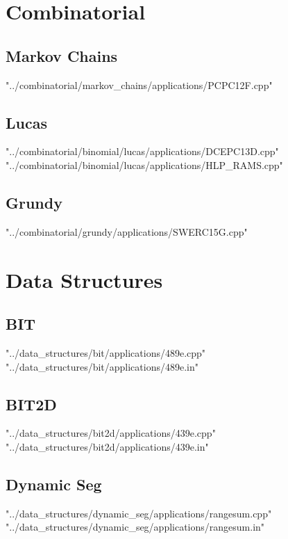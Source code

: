 \documentclass [12pt,onecolumn,oneside]{article}
\begin{document}
\pagestyle{fancy}
\fancyfoot{}
\fancyhead[R]{\thepage}
\renewcommand{\headrulewidth}{0.4pt}
\tableofcontents
\scriptsize

\bigskip
\newpage
\section{Combinatorial}
\subsection{ Markov Chains}
 {"../combinatorial/markov_chains/applications/PCPC12F.cpp"}
\newpage

\subsection{ Lucas}
 {"../combinatorial/binomial/lucas/applications/DCEPC13D.cpp"}
\newpage
 {"../combinatorial/binomial/lucas/applications/HLP_RAMS.cpp"}
\newpage

\subsection{ Grundy}
 {"../combinatorial/grundy/applications/SWERC15G.cpp"}
\newpage

\section{Data Structures}
\subsection{ BIT}
 {"../data_structures/bit/applications/489e.cpp"}
 {"../data_structures/bit/applications/489e.in"}
\newpage

\subsection{ BIT2D}
 {"../data_structures/bit2d/applications/439e.cpp"}
 {"../data_structures/bit2d/applications/439e.in"}
\newpage

\subsection{ Dynamic Seg}
 {"../data_structures/dynamic_seg/applications/rangesum.cpp"}
 {"../data_structures/dynamic_seg/applications/rangesum.in"}
\newpage
\end{document}
